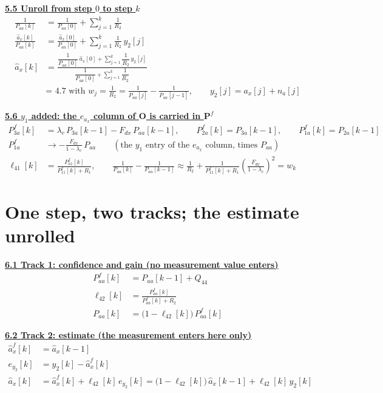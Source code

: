 \documentclass[11pt,a4paper]{ctexart}
\newcommand{\lc}{\lambda_c}
\newcommand{\hd}[1]{\par\bigskip\noindent\underline{\textbf{#1}}}
\begin{document}
\hd{5.5 Unroll from step $0$ to step $k$}
\[
\begin{aligned}
\frac{1}{P_{aa}[k]} &= \frac{1}{P_{aa}[0]} + \sum_{j=1}^{k}\frac{1}{R_2} \\
\frac{\hat a_x[k]}{P_{aa}[k]} &= \frac{\hat a_x[0]}{P_{aa}[0]} + \sum_{j=1}^{k}\frac{1}{R_2}\,y_2[j] \\
\hat a_x[k] &= \frac{\dfrac{1}{P_{aa}[0]}\,\hat a_x[0] + \sum_{j=1}^{k}\dfrac{1}{R_2}\,y_2[j]}{\dfrac{1}{P_{aa}[0]} + \sum_{j=1}^{k}\dfrac{1}{R_2}}
\\
&\text{= 4.7 with } w_j = \frac{1}{R_2} = \frac{1}{P_{aa}[j]} - \frac{1}{P_{aa}[j-1]}, \qquad y_2[j] = a_x[j] + n_a[j]
\end{aligned}
\]

\hd{5.6 $y_1$ added: the $e_{a_x}$ column of $\mathbf{O}$ is carried in $\mathbf{P}^f$}
\[
\begin{aligned}
P^f_{3a}[k] &= \lc\,P_{3a}[k-1] - F_{dx}\,P_{aa}[k-1], \qquad P^f_{2a}[k] = P_{3a}[k-1], \qquad P^f_{1a}[k] = P_{2a}[k-1] \\
P^f_{1a} &\to -\frac{F_{dx}}{1-\lc}\,P_{aa} \qquad (\text{the } y_1 \text{ entry of the } e_{a_x} \text{ column, times } P_{aa}) \\
\ell_{41}[k] &= \frac{P^f_{a1}[k]}{P^f_{11}[k] + R_1}, \qquad
\frac{1}{P_{aa}[k]} - \frac{1}{P_{aa}[k-1]} \approx \frac{1}{R_2} + \frac{1}{P^f_{11}[k] + R_1}\left(\frac{F_{dx}}{1-\lc}\right)^{2} = w_k
\end{aligned}
\]

\clearpage
\section{One step, two tracks; the estimate unrolled}

\hd{6.1 Track 1: confidence and gain (no measurement value enters)}
\[
\begin{aligned}
P^f_{aa}[k] &= P_{aa}[k-1] + Q_{44} \\
\ell_{42}[k] &= \frac{P^f_{aa}[k]}{P^f_{aa}[k] + R_2} \\
P_{aa}[k] &= \big(1 - \ell_{42}[k]\big)\,P^f_{aa}[k]
\end{aligned}
\]

\hd{6.2 Track 2: estimate (the measurement enters here only)}
\[
\begin{aligned}
\hat a_x^f[k] &= \hat a_x[k-1] \\
e_{y_2}[k] &= y_2[k] - \hat a_x^f[k] \\
\hat a_x[k] &= \hat a_x^f[k] + \ell_{42}[k]\,e_{y_2}[k] = \big(1 - \ell_{42}[k]\big)\,\hat a_x[k-1] + \ell_{42}[k]\,y_2[k]
\end{aligned}
\]
\end{document}
